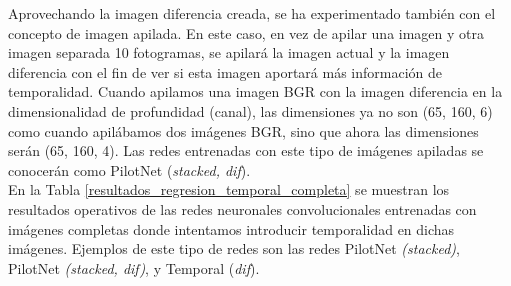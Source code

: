 Aprovechando la imagen diferencia creada, se ha experimentado también con el concepto de imagen apilada. En este caso, en vez de apilar una imagen y otra imagen separada 10 fotogramas, se apilará la imagen actual y la imagen diferencia con el fin de ver si esta imagen aportará más información de temporalidad. Cuando apilamos una imagen BGR con la imagen diferencia en la dimensionalidad de profundidad (canal), las dimensiones ya no son (65, 160, 6) como cuando apilábamos dos imágenes BGR, sino que ahora las dimensiones serán (65, 160, 4). Las redes entrenadas con este tipo de imágenes apiladas se conocerán como PilotNet (\textit{stacked, dif}). \\


En la Tabla \ref{resultados_regresion_temporal_completa} se muestran los resultados operativos de las redes neuronales convolucionales entrenadas con imágenes completas donde intentamos introducir temporalidad en dichas imágenes. Ejemplos de este tipo de redes son las redes PilotNet \textit{(stacked)}, PilotNet \textit{(stacked, dif)}, y Temporal (\textit{dif}).\\


